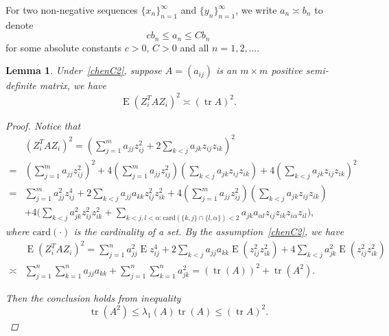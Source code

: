 \documentclass[review]{elsarticle}
\DeclareMathOperator{\mytr}{tr}
\DeclareMathOperator{\myE}{E}
\theoremstyle{plain}
\newtheorem{lemma}{Lemma}
\theoremstyle{definition}
\theoremstyle{remark}
\begin{document}
For two non-negative sequences $\{x_n\}_{n=1}^{\infty}$ and $\{y_n\}_{n=1}^{\infty}$, we write $a_n\asymp b_n$ to denote 
\begin{equation*}
cb_n\leq a_n\leq C b_n
\end{equation*}
for some absolute constants $c>0$, $C>0$ and all $n=1,2,\ldots$.
\begin{lemma}\label{lemmaQ}
    Under~\eqref{chenC2}, suppose $A=(a_{ij})$ is an $m\times m$ positive semi-definite matrix, we have
        \begin{equation*}
        \myE {(Z_i^T A Z_i)}^2\asymp {(\mytr A)}^2.
        \end{equation*}
\begin{proof}
Notice that
    \begin{equation*}
    \begin{aligned}
        &{(Z_i^T A Z_i)}^2
        =
        (\sum_{j=1}^m a_{jj}z_{ij}^2+2\sum_{k<j}a_{jk}z_{ij}z_{ik})^2\\
        =&
        (\sum_{j=1}^m a_{jj}z_{ij}^2)^2+
        4(\sum_{j=1}^m a_{jj}z_{ij}^2)(\sum_{k<j}a_{jk}z_{ij}z_{ik})
        +
        4(\sum_{k<j}a_{jk}z_{ij}z_{ik})^2\\
        =&
        \sum_{j=1}^m a_{jj}^2z_{ij}^4+2\sum_{k<j}a_{jj}a_{kk}z_{ij}^2 z_{ik}^2+
        4(\sum_{j=1}^m a_{jj}z_{ij}^2)(\sum_{k<j}a_{jk}z_{ij}z_{ik})\\
        &+
        4\Big(\sum_{k<j}a_{jk}^2z_{ij}^2z_{ik}^2
        +\sum_{k<j,l<\alpha:\mathrm{card}(\{k,j\}\cap\{l,\alpha\})<2} a_{jk}a_{\alpha l}z_{ij}z_{ik}z_{i\alpha}z_{il}\Big),
    \end{aligned}
    \end{equation*}
    where $\mathrm{card}(\cdot)$ is the cardinality of a set.
    By the assumption~\eqref{chenC2}, we have
    \begin{equation*}
    \begin{aligned}
        &\myE{(Z_i^T A Z_i)}^2
        =
        \sum_{j=1}^n a_{jj}^2 \myE z_{ij}^4+2\sum_{k<j}a_{jj}a_{kk}\myE(z_{ij}^2 z_{ik}^2)+
        4\sum_{k<j}a_{jk}^2 \myE(z_{ij}^2z_{ik}^2)\\
        \asymp &
        \sum_{j=1}^n\sum_{k=1}^n a_{jj}a_{kk}+
        \sum_{j=1}^n\sum_{k=1}^n a_{jk}^2
        ={(\mytr (A))}^2+\mytr ( A^2).
    \end{aligned}
    \end{equation*}

     Then the conclusion holds from inequality
     \begin{equation*}
     \mytr ( A^2)\leq \lambda_1 (A) \mytr(A)\leq {(\mytr A)}^2.
     \end{equation*}

\end{proof}
\end{lemma}
\end{document}
